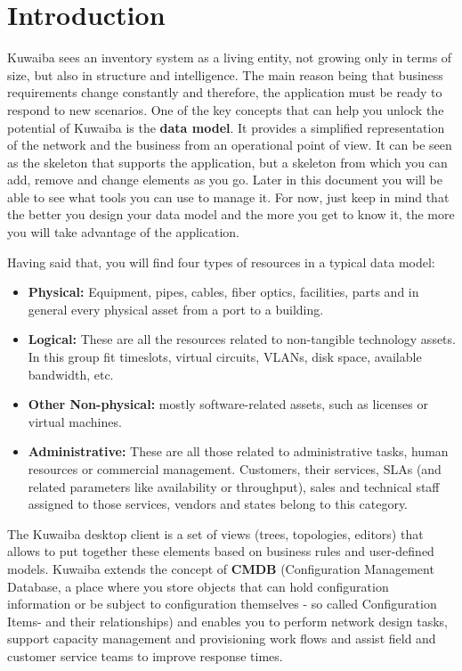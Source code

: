 \documentclass[a4paper]{article}
\begin{document}
	\section{Introduction}
	Kuwaiba sees an inventory system as a living entity, not growing only in terms of size, but also in structure and intelligence. The main reason being that business requirements change constantly and therefore, the application must be ready to respond to new scenarios. One of the key concepts that can help you unlock the potential of Kuwaiba is the \textbf{data model}. It provides a simplified representation of the network and the business from an operational point of view. It can be seen as the skeleton that supports the application, but a skeleton from which you can add, remove and change elements as you go. Later in this document you will be able to see what tools you can use to manage it. For now, just keep in mind that the better you design your data model and the more you get to know it, the more you will take advantage of the application.\newline
	
	Having said that, you will find four types of resources in a typical data model:
	\begin{itemize}
		\item \textbf{Physical:} Equipment, pipes, cables, fiber optics, facilities, parts and in general every physical asset from a port to a building. 
		\item \textbf{Logical:} These are all the resources related to non-tangible technology assets. In this group fit timeslots, virtual circuits, VLANs, disk space, available bandwidth, etc.
		\item \textbf{Other Non-physical:} mostly software-related assets, such as licenses or virtual machines.
		\item \textbf{Administrative:} These are all those related to administrative tasks, human resources or commercial management. Customers, their services, SLAs (and related parameters like availability or throughput), sales and technical staff assigned to those services, vendors and states belong to this category.
	\end{itemize}
	The Kuwaiba desktop client is a set of views (trees, topologies, editors) that allows to put together these elements based on business rules and  user-defined models. Kuwaiba extends the concept of \textbf{CMDB} (Configuration Management Database, a place where you store objects that can hold configuration information or be subject to configuration themselves - so called Configuration Items- and their relationships)  and enables you to perform network design tasks, support capacity management and provisioning work flows and assist field and customer service teams to improve response times.\newline
	
\end{document}

